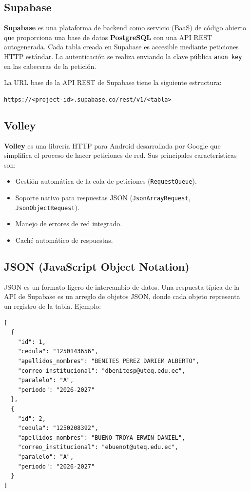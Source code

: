 \documentclass[12pt]{article}
\begin{document}
\subsection{Supabase}
\textbf{Supabase} es una plataforma de backend como servicio (BaaS) de código abierto que proporciona una base de datos \textbf{PostgreSQL} con una API REST autogenerada. Cada tabla creada en Supabase es accesible mediante peticiones HTTP estándar. La autenticación se realiza enviando la clave pública \texttt{anon key} en las cabeceras de la petición.

La URL base de la API REST de Supabase tiene la siguiente estructura:
\begin{center}
\texttt{https://\textless project-id\textgreater.supabase.co/rest/v1/\textless tabla\textgreater}
\end{center}

\subsection{Volley}
\textbf{Volley} es una librería HTTP para Android desarrollada por Google que simplifica el proceso de hacer peticiones de red. Sus principales características son:
\begin{itemize}[leftmargin=1.5cm]
    \item Gestión automática de la cola de peticiones (\texttt{RequestQueue}).
    \item Soporte nativo para respuestas JSON (\texttt{JsonArrayRequest}, \texttt{JsonObjectRequest}).
    \item Manejo de errores de red integrado.
    \item Caché automático de respuestas.
\end{itemize}

\subsection{JSON (JavaScript Object Notation)}
JSON es un formato ligero de intercambio de datos. Una respuesta típica de la API de Supabase es un arreglo de objetos JSON, donde cada objeto representa un registro de la tabla. Ejemplo:

\begin{lstlisting}[language={},caption={Ejemplo de respuesta JSON de Supabase}]
[
  {
    "id": 1,
    "cedula": "1250143656",
    "apellidos_nombres": "BENITES PEREZ DARIEM ALBERTO",
    "correo_institucional": "dbenitesp@uteq.edu.ec",
    "paralelo": "A",
    "periodo": "2026-2027"
  },
  {
    "id": 2,
    "cedula": "1250208392",
    "apellidos_nombres": "BUENO TROYA ERWIN DANIEL",
    "correo_institucional": "ebuenot@uteq.edu.ec",
    "paralelo": "A",
    "periodo": "2026-2027"
  }
]
\end{lstlisting}
\end{document}
